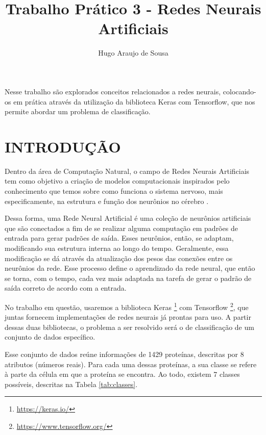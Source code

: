 \documentclass[12pt]{article}
\title{Trabalho Prático 3 - Redes Neurais Artificiais}
\author{Hugo Araujo de Sousa}
\begin{document}
 

\maketitle
     
\begin{resumo}
  Nesse trabalho são explorados conceitos relacionados a redes neurais,
  colocando-os em prática através da utilização da biblioteca Keras com Tensorflow, 
  que nos permite abordar um problema de classificação.
\end{resumo}

\section{INTRODUÇÃO}

Dentro da área de Computação Natural, o campo de Redes Neurais Artificiais
tem como objetivo a criação de modelos computacionais inspirados pelo
conhecimento que temos sobre como funciona o sistema nervoso, mais
especificamente, na estrutura e função dos neurônios no cérebro
\cite{clevalg}.

Dessa forma, uma Rede Neural Artificial é uma coleção de neurônios
artificiais que são conectados a fim de se realizar alguma computação
em padrões de entrada para gerar padrões de saída. Esses neurônios,
então, se adaptam, modificando sua estrutura interna ao longo do tempo.
Geralmente, essa modificação se dá através da atualização dos pesos
das conexões entre os neurônios da rede. Esse processo define o
aprendizado da rede neural, que então se torna, com o tempo, cada
vez mais adaptada na tarefa de gerar o padrão de saída correto de 
acordo com a entrada.

No trabalho em questão, usaremos a biblioteca Keras 
\footnote{\url{https://keras.io/}} com Tensorflow
\footnote{\url{https://www.tensorflow.org/}}, que juntas fornecem
implementações de redes neurais já prontas para uso. A partir dessas 
duas bibliotecas, o problema a ser resolvido será o de classificação
de um conjunto de dados específico.

Esse conjunto de dados reúne informações de 1429 proteínas, descritas
por 8 atributos (números reais). Para cada uma dessas proteínas, a sua
classe se refere à parte da célula em que a proteína se encontra.
Ao todo, existem 7 classes possíveis, descritas na Tabela
\ref{tab:classes}.
\end{document}

